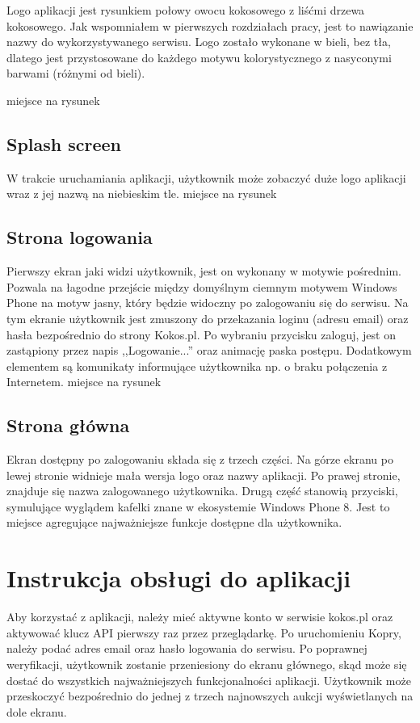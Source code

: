 \documentclass[a4paper,twoside,titlepage,openright]{book}
\begin{document}
Logo aplikacji jest rysunkiem połowy owocu kokosowego z liśćmi drzewa kokosowego. Jak wspomniałem w pierwszych rozdziałach pracy, jest to nawiązanie nazwy do wykorzystywanego serwisu. Logo zostało wykonane w bieli, bez tła, dlatego jest przystosowane do każdego motywu kolorystycznego z nasyconymi barwami (różnymi od bieli).

{\color{red} miejsce na rysunek}


\subsection{Splash screen}

W trakcie uruchamiania aplikacji, użytkownik może zobaczyć duże logo aplikacji wraz z jej nazwą na niebieskim tle. 
{\color{red} miejsce na rysunek}


\subsection{Strona logowania}
Pierwszy ekran jaki widzi użytkownik, jest on wykonany w motywie pośrednim. Pozwala na łagodne przejście między domyślnym ciemnym motywem Windows Phone na motyw jasny, który będzie widoczny po zalogowaniu się do serwisu. Na tym ekranie użytkownik jest zmuszony do przekazania loginu (adresu email) oraz hasła bezpośrednio do strony Kokos.pl. Po wybraniu przycisku zaloguj, jest on zastąpiony przez napis ,,Logowanie...'' oraz animację paska postępu. Dodatkowym elementem są komunikaty informujące użytkownika np. o braku połączenia z Internetem.
{\color{red} miejsce na rysunek}


\subsection{Strona główna}
Ekran dostępny po zalogowaniu składa się z trzech części. Na górze ekranu po lewej stronie widnieje mała wersja logo oraz nazwy aplikacji. Po prawej stronie, znajduje się nazwa zalogowanego użytkownika. Drugą część stanowią przyciski, symulujące wyglądem kafelki znane w ekosystemie Windows Phone 8. Jest to miejsce agregujące najważniejsze funkcje dostępne dla użytkownika. 



\section{Instrukcja obsługi do aplikacji}

Aby korzystać z aplikacji, należy mieć aktywne konto w serwisie kokos.pl oraz aktywować klucz API pierwszy raz przez przeglądarkę. Po uruchomieniu Kopry, należy podać adres email oraz hasło logowania do serwisu. Po poprawnej weryfikacji, użytkownik zostanie przeniesiony do ekranu głównego, skąd może się dostać do wszystkich najważniejszych funkcjonalności aplikacji. Użytkownik może przeskoczyć bezpośrednio do jednej z trzech najnowszych aukcji wyświetlanych na dole ekranu.
\end{document}
